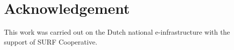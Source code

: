 \documentclass{article}
\begin{document}
\section{Acknowledgement}\label{sec:ack}
This work was carried out on the Dutch national e-infrastructure with the support of SURF Cooperative. 




%
%
%
%
\end{document}
